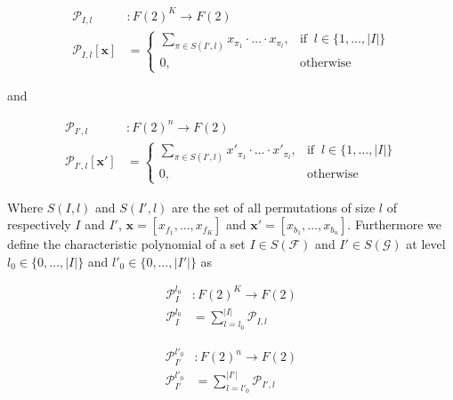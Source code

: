 \documentclass[a4paper, 11pt]{article}
\begin{document}
\begin{align*}
\mathcal{P}_{I, l}&: F(2)^{K} \rightarrow F(2)\\
\mathcal{P}_{I, l} [\textbf{x}] &= \begin{cases} \sum_{\pi \in S(I', l)} x_{\pi_1} \cdot \ldots \cdot x_{\pi_l}, & \text{if }\ l \in \lbrace 1, \ldots, \vert I \vert \rbrace \\ 0, & \text{otherwise} \end{cases}
\end{align*}

and 

\begin{align*}
\mathcal{P}_{I', l}&: F(2)^{n} \rightarrow F(2)\\
\mathcal{P}_{I', l} [\textbf{x}'] &= \begin{cases} \sum_{\pi \in S(I', l)} x'_{\pi_1} \cdot \ldots \cdot x'_{\pi_l}, & \text{if }\ l \in \lbrace 1, \ldots, \vert I \vert \rbrace \\ 0, & \text{otherwise} \end{cases}
\end{align*}


Where $S(I, l)$ and $S(I', l)$ are the set of all permutations of size $l$ of respectively $I$ and $I'$, $\textbf{x} = [x_{f_1}, \ldots, x_{f_K}]$ and $\textbf{x}' = [x_{b_1}, \ldots, x_{b_n}]$. Furthermore we define the characteristic polynomial of a set $I \in S(\mathcal{F})$ and $I' \in S(\mathcal{G})$ at level $l_0 \in \{0, \ldots, \vert I \vert \}$ and $l'_0 \in \{0, \ldots, \vert I' \vert \}$  as 

\vspace{10px}\noindent\begin{minipage}{.5\linewidth}
\begin{align*}
\mathcal{P}^{l_0}_{I} &: F(2)^{K} \rightarrow F(2)\\
\mathcal{P}^{l_0}_{I} &= \sum_{l = l_0}^{\vert I \vert} \mathcal{P}_{I, l}
\end{align*}
\end{minipage}%
\noindent\begin{minipage}{.5\linewidth}
\begin{align*}
\mathcal{P}^{l'_0}_{I'} &: F(2)^{n} \rightarrow F(2)\\
\mathcal{P}^{l'_0}_{I'} &= \sum_{l = l'_0}^{\vert I' \vert} \mathcal{P}_{I', l}
\end{align*}
\end{minipage}\vspace{15px}
\end{document}
